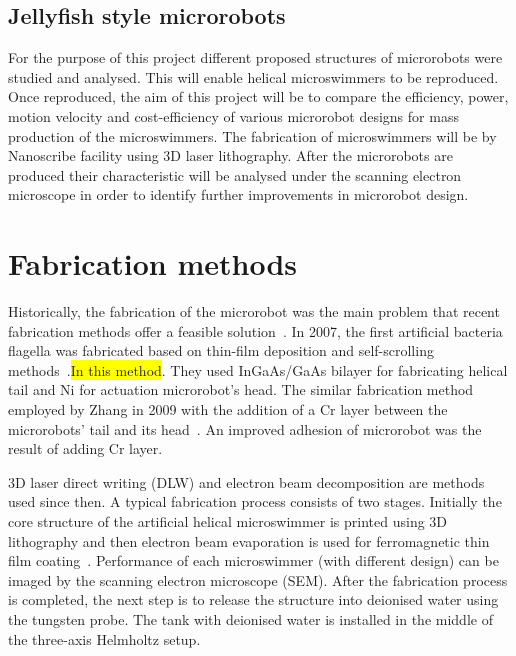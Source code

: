 \documentclass[12pt,a4paper,titlepage]{report}
\newcommand{\hilight}[1]{\colorbox{yellow}{#1}}
\begin{document}
\subsection{Jellyfish style microrobots}
For the purpose of this project different proposed structures of microrobots were studied
 and analysed. This will enable helical microswimmers to be reproduced. Once reproduced, the aim of this project will be to compare
 the efficiency, power, motion velocity and cost-efficiency of various microrobot designs for mass production
 of the microswimmers. The fabrication of microswimmers will be by Nanoscribe facility using 3D laser
 lithography. After the microrobots are produced their characteristic will be analysed
 under the scanning electron microscope in order to identify further improvements in microrobot design. 



\section{Fabrication methods} \label{fabrication}

Historically, the fabrication of the microrobot was the main problem that recent fabrication methods 
offer a feasible solution~\citep{gao2013bioinspired}.
In 2007, the first artificial bacteria flagella was fabricated based on thin-film deposition and self-scrolling
 methods~\citep{qiu2014noncytotoxic}.\hilight{In this method}. They used InGaAs/GaAs bilayer for fabricating
helical tail and Ni for actuation microrobot\rq{}s head. The similar fabrication method employed by Zhang
 in 2009 with the addition of a Cr layer between the microrobots\rq{} tail and its head~\citep{qiu2014noncytotoxic}.
An improved adhesion of microrobot was the result of adding Cr layer. 

3D laser direct writing (DLW) and electron beam decomposition are methods used since then. A typical 
fabrication process consists of two stages. Initially the core structure of the artificial helical 
microswimmer is printed using 3D lithography and then electron beam evaporation is used for 
ferromagnetic thin film coating~\citep{tottori2013artificial}.  
Performance of each microswimmer (with different design) can be imaged by the scanning electron
 microscope (SEM). After the fabrication process is completed, the next step is to release the structure into 
deionised water using the tungsten probe. The tank with deionised water is installed in the middle of the 
three-axis Helmholtz setup. 
\end{document}

